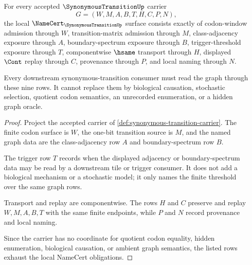 \begin{theorem}
\label{thm:synonymous-transition-namecert-obligations}
For every accepted $\SynonymousTransitionUp$ carrier
$$
G=(W,M,A,B,T,H,C,P,N),
$$
the local $\NameCert_{\SynonymousTransitionUp}$ surface consists exactly of codon-window admission through $W$, transition-matrix admission through $M$, class-adjacency exposure through $A$, boundary-spectrum exposure through $B$, trigger-threshold exposure through $T$, componentwise $\hsame$ transport through $H$, displayed $\Cont$ replay through $C$, provenance through $P$, and local naming through $N$.

Every downstream synonymous-transition consumer must read the graph through these nine rows. It cannot replace them by biological causation, stochastic selection, quotient codon semantics, an unrecorded enumeration, or a hidden graph oracle.
\end{theorem}
\begin{proof}
Project the accepted carrier of \autoref{def:synonymous-transition-carrier}. The finite codon surface is $W$, the one-bit transition source is $M$, and the named graph data are the class-adjacency row $A$ and boundary-spectrum row $B$.

The trigger row $T$ records when the displayed adjacency or boundary-spectrum data may be read by a downstream tile or trigger consumer. It does not add a biological mechanism or a stochastic model; it only names the finite threshold over the same graph rows.

Transport and replay are componentwise. The rows $H$ and $C$ preserve and replay $W,M,A,B,T$ with the same finite endpoints, while $P$ and $N$ record provenance and local naming.

Since the carrier has no coordinate for quotient codon equality, hidden enumeration, biological causation, or ambient graph semantics, the listed rows exhaust the local NameCert obligations.
\end{proof}

